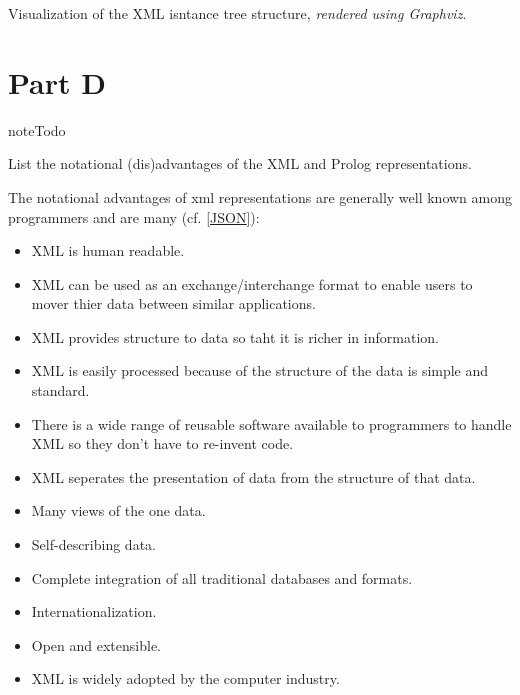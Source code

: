 \documentclass[letterpaper,10pt,english]{sphinxmanual}
\begin{document}
Visualization of the XML isntance tree structure, \emph{rendered using Graphviz}.


\section{Part D}
\label{assign0:part-d}
\begin{notice}{note}{Todo}

List the notational (dis)advantages of the XML and Prolog representations.
\end{notice}

The notational advantages of xml representations are generally well known among programmers and are many (cf. {\hyperref[assign0:json]{{[}JSON{]}}}):
\begin{itemize}
\item {} 
XML is human readable.

\item {} 
XML can be used as an exchange/interchange format to enable users to mover thier data between similar applications.

\item {} 
XML provides structure to data so taht it is richer in information.

\item {} 
XML is easily processed because of the structure of the data is simple and standard.

\item {} 
There is a wide range of reusable software available to programmers to handle XML so they don't have to re-invent code.

\item {} 
XML seperates the presentation of data from the structure of that data.

\item {} 
Many views of the one data.

\item {} 
Self-describing data.

\item {} 
Complete integration of all traditional databases and formats.

\item {} 
Internationalization.

\item {} 
Open and extensible.

\item {} 
XML is widely adopted by the computer industry.

\end{itemize}
\end{document}
